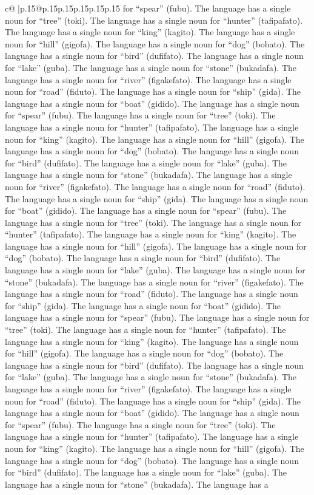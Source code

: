 \documentclass{article}
\begin{document}
{\begin{supertabular}{c@{$\;$}|p{.15\linewidth}@{}p{.15\linewidth}p{.15\linewidth}p{.15\linewidth}p{.15\linewidth}p{.15\linewidth}}
{{{for “spear” (fubu). The language has a single noun for “tree” (toki). The language has a single noun for “hunter” (tafipafato). The language has a single noun for “king” (kagito). The language has a single noun for “hill” (gigofa). The language has a single noun for “dog” (bobato). The language has a single noun for “bird” (dufifato). The language has a single noun for “lake” (guba). The language has a single noun for “stone” (bukadafa). The language has a single noun for “river” (figakefato). The language has a single noun for “road” (fiduto). The language has a single noun for “ship” (gida). The language has a single noun for “boat” (gidido). The language has a single noun for “spear” (fubu). The language has a single noun for “tree” (toki). The language has a single noun for “hunter” (tafipafato). The language has a single noun for “king” (kagito). The language has a single noun for “hill” (gigofa). The language has a single noun for “dog” (bobato). The language has a single noun for “bird” (dufifato). The language has a single noun for “lake” (guba). The language has a single noun for “stone” (bukadafa). The language has a single noun for “river” (figakefato). The language has a single noun for “road” (fiduto). The language has a single noun for “ship” (gida). The language has a single noun for “boat” (gidido). The language has a single noun for “spear” (fubu). The language has a single noun for “tree” (toki). The language has a single noun for “hunter” (tafipafato). The language has a single noun for “king” (kagito). The language has a single noun for “hill” (gigofa). The language has a single noun for “dog” (bobato). The language has a single noun for “bird” (dufifato). The language has a single noun for “lake” (guba). The language has a single noun for “stone” (bukadafa). The language has a single noun for “river” (figakefato). The language has a single noun for “road” (fiduto). The language has a single noun for “ship” (gida). The language has a single noun for “boat” (gidido). The language has a single noun for “spear” (fubu). The language has a single noun for “tree” (toki). The language has a single noun for “hunter” (tafipafato). The language has a single noun for “king” (kagito). The language has a single noun for “hill” (gigofa). The language has a single noun for “dog” (bobato). The language has a single noun for “bird” (dufifato). The language has a single noun for “lake” (guba). The language has a single noun for “stone” (bukadafa). The language has a single noun for “river” (figakefato). The language has a single noun for “road” (fiduto). The language has a single noun for “ship” (gida). The language has a single noun for “boat” (gidido). The language has a single noun for “spear” (fubu). The language has a single noun for “tree” (toki). The language has a single noun for “hunter” (tafipafato). The language has a single noun for “king” (kagito). The language has a single noun for “hill” (gigofa). The language has a single noun for “dog” (bobato). The language has a single noun for “bird” (dufifato). The language has a single noun for “lake” (guba). The language has a single noun for “stone” (bukadafa). The language has a }}}
\end{supertabular}}
\end{document}
